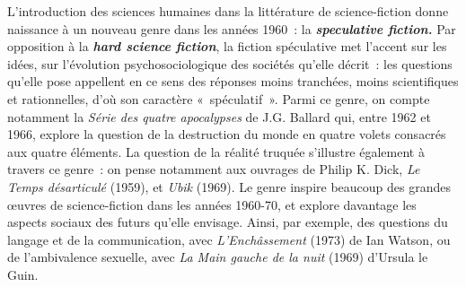 \documentclass[letterpaper,portrait,12pt]{article}
\begin{document}
\emph{	}L'introduction des sciences humaines dans la litt\'{e}rature de science-fiction donne naissance \`{a} un nouveau genre dans les ann\'{e}es 1960 : la \textbf{\emph{speculative fiction.}} Par opposition \`{a} la \textbf{\emph{hard science fiction}}, la fiction sp\'{e}culative met l'accent sur les id\'{e}es, sur l'\'{e}volution psychosociologique des soci\'{e}t\'{e}s qu'elle d\'{e}crit : les questions qu'elle pose appellent en ce sens des r\'{e}ponses moins tranch\'{e}es, moins scientifiques et rationnelles, d'où son caract\`{e}re « sp\'{e}culatif ». Parmi ce genre, on compte notamment la \emph{S\'{e}rie des quatre apocalypses} de J.G. Ballard qui, entre 1962 et 1966, explore la question de la destruction du monde en quatre volets consacr\'{e}s aux quatre \'{e}l\'{e}ments. La question de la r\'{e}alit\'{e} truqu\'{e}e s'illustre \'{e}galement \`{a} travers ce genre : on pense notamment aux ouvrages de Philip K. Dick, \emph{Le Temps d\'{e}sarticul\'{e}} (1959), et \emph{Ubik} (1969). Le genre inspire beaucoup des grandes \oe{}uvres de science-fiction dans les ann\'{e}es 1960-70, et explore davantage les aspects sociaux des futurs qu'elle envisage. Ainsi, par exemple, des questions du langage et de la communication, avec \emph{L'Ench\^{a}ssement }(1973) de Ian Watson, ou de l'ambivalence sexuelle, avec \emph{La Main gauche de la nuit }(1969) d'Ursula le Guin.
\end{document}
